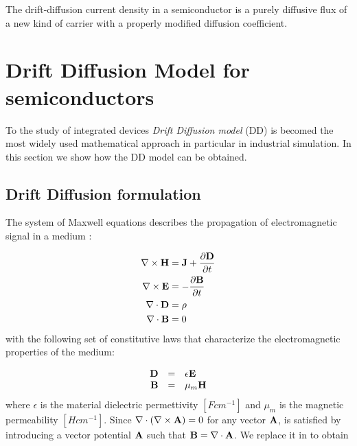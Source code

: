 \begin{Osservazione}
The drift-diffusion current density in a semiconductor is a purely diffusive flux of a new kind of carrier with a properly modified diffusion coefficient. 
\end{Osservazione}


\section{Drift Diffusion Model for semiconductors}
\label{section: dd model for semi}

To the study of integrated devices \textit{Drift Diffusion model} (DD) is becomed the most widely used mathematical approach in particular in industrial simulation. In this section we show how the DD model can be obtained.

\subsection{Drift Diffusion formulation}
 The system of Maxwell equations describes the propagation of electromagnetic signal in a medium \cite{Jackson:ElettroClassica}:

\begin{align}
\nabla \times \mathbf{H} & =  \mathbf{J} + \dfrac{\partial \mathbf{D}}{\partial t} \label{eq: magnetic equation} \\ 
\nabla \times \mathbf{E} & =  - \dfrac{\partial \mathbf{B}}{\partial t} \label{eq: ampere law}\\ 
\nabla \cdot \mathbf{D} & =  \rho \label{eq: gauss law}\\ 
\nabla \cdot \mathbf{B} &  =  0 \label{eq: no magetic charge law}
\end{align}
with the following set of constitutive laws that characterize the electromagnetic properties of the medium:

\begin{equation}
\begin{array}{rcl}
\mathbf{D} & = & \epsilon \mathbf{E} \\
\mathbf{B} & = & \mu_m \mathbf{H} \label{eq: magnetic costitutive}
\end{array}
\end{equation}
where $\epsilon$ is the material dielectric permettivity $[F cm^{-1}]$ and $\mu_m$ is the magnetic permeability $[H cm^{-1}]$. Since $\nabla \cdot (\nabla \times \mathbf{A})=0$ for any vector $\mathbf{A}$,  is satisfied by introducing a vector potential $\mathbf{A}$ such that $\mathbf{B}= \nabla \cdot \mathbf{A}$. We replace it in  to obtain

